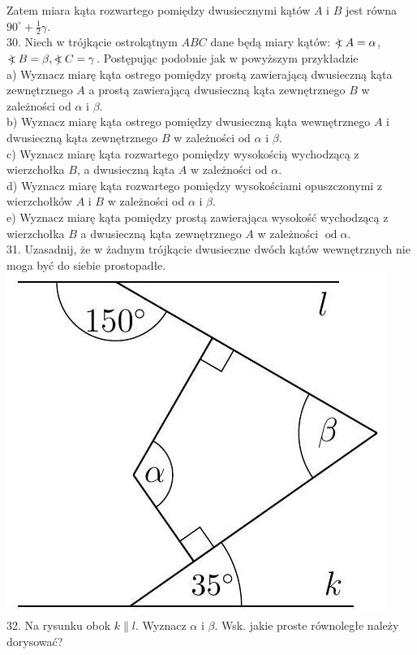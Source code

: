 \documentclass[10pt]{article}
\newcommand\Varangle{\mathop{{<\!\!\!\!\!\text{\small)}}\:}\nolimits}
\begin{document}
Zatem miara kąta rozwartego pomiędzy dwusiecznymi kątów \(A\) i \(B\) jest równa \(90^{\circ}+\frac{1}{2} \gamma\).\\
30. Niech w trójkącie ostrokątnym \(A B C\) dane będą miary kątów: \(\Varangle A=\alpha\), \(\Varangle B=\beta, \Varangle C=\gamma\). Postępując podobnie jak w powyższym przykładzie\\
a) Wyznacz miarę kąta ostrego pomiędzy prostą zawierającą dwusieczną kąta zewnętrznego \(A\) a prostą zawierającą dwusieczną kąta zewnętrznego \(B\) w zależności od \(\alpha\) i \(\beta\).\\
b) Wyznacz miarę kąta ostrego pomiędzy dwusieczną kąta wewnętrznego \(A\) i dwusieczną kąta zewnętrznego \(B\) w zależności od \(\alpha\) i \(\beta\).\\
c) Wyznacz miarę kąta rozwartego pomiędzy wysokością wychodzącą z wierzchołka \(B\), a dwusieczną kąta \(A\) w zależności od \(\alpha\).\\
d) Wyznacz miarę kąta rozwartego pomiędzy wysokościami opuszczonymi z wierzchołków \(A\) i \(B\) w zależności od \(\alpha\) i \(\beta\).\\
e) Wyznacz miarę kąta pomiędzy prostą zawierająca wysokość wychodzącą z wierzchołka \(B\) a dwusieczną kąta zewnętrznego \(A\) w zależności \(\operatorname{od} \alpha\).\\
31. Uzasadnij, że w żadnym trójkącie dwusieczne dwóch kątów wewnętrznych nie moga być do siebie prostopadłe.\\
\includegraphics[max width=\textwidth, center]{2024_11_21_71f62bd117d375398909g-025}\\
32. Na rysunku obok \(k \| l\). Wyznacz \(\alpha\) i \(\beta\). Wsk. jakie proste równoległe należy dorysować?
\end{document}
